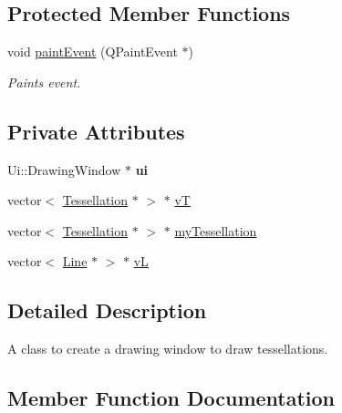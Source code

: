 \subsection*{Protected Member Functions}
\begin{DoxyCompactItemize}
\item 
\hypertarget{class_drawing_window_aceb9c5cc4f2ef40d99aca7d3fbd4e91a}{}void \hyperlink{class_drawing_window_aceb9c5cc4f2ef40d99aca7d3fbd4e91a}{paint\+Event} (Q\+Paint\+Event $\ast$)\label{class_drawing_window_aceb9c5cc4f2ef40d99aca7d3fbd4e91a}

\begin{DoxyCompactList}\small\item\em Paints event. \end{DoxyCompactList}\end{DoxyCompactItemize}
\subsection*{Private Attributes}
\begin{DoxyCompactItemize}
\item 
\hypertarget{class_drawing_window_ad58ced401c1eaf6cfaf67a0f8f94ce18}{}Ui\+::\+Drawing\+Window $\ast$ {\bfseries ui}\label{class_drawing_window_ad58ced401c1eaf6cfaf67a0f8f94ce18}

\item 
vector$<$ \hyperlink{class_tessellation}{Tessellation} $\ast$ $>$ $\ast$ \hyperlink{class_drawing_window_a00c917f0910ac7b70729d6a48f0602ac}{v\+T}
\item 
vector$<$ \hyperlink{class_tessellation}{Tessellation} $\ast$ $>$ $\ast$ \hyperlink{class_drawing_window_a82bd46efc8a35b62fcd207c42aa49ade}{my\+Tessellation}
\item 
vector$<$ \hyperlink{class_line}{Line} $\ast$ $>$ $\ast$ \hyperlink{class_drawing_window_a6e1effc34bb2f2c43becfd1df203b693}{v\+L}
\end{DoxyCompactItemize}


\subsection{Detailed Description}
A class to create a drawing window to draw tessellations. 

\subsection{Member Function Documentation}
\hypertarget{class_drawing_window_a3097e096223530c9f93737441d77422f}{}
